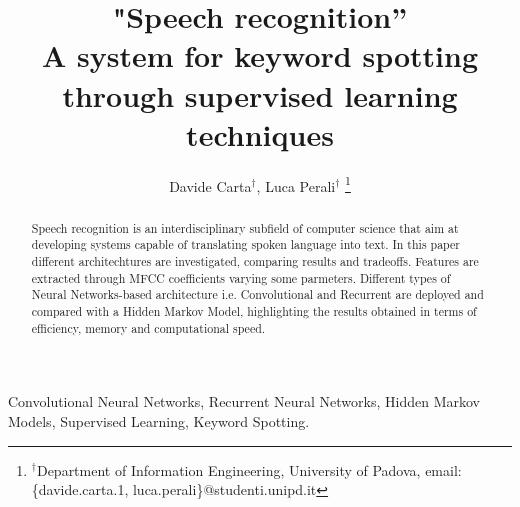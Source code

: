 \documentclass[10pt, conference, letterpaper]{IEEEtran}
\title{"Speech recognition'' \\ A system for keyword spotting through supervised learning techniques }
\author{Davide Carta$^\dag$, Luca Perali$^\dag$
\thanks{$^\dag$Department of Information Engineering, University of Padova, email: \{davide.carta.1, luca.perali\}@studenti.unipd.it}
}
\begin{document}
\maketitle

\begin{abstract}
 Speech recognition is an interdisciplinary subfield of computer science that aim at developing systems capable of translating spoken language into text. In this paper different architechtures are investigated, comparing results and tradeoffs. Features are extracted through MFCC coefficients varying some parmeters.
Different types of Neural Networks-based architecture i.e. Convolutional and Recurrent are deployed and compared with a Hidden Markov Model, highlighting the results obtained in terms of efficiency, memory and computational speed.\\
\end{abstract}

\IEEEkeywords
 Convolutional Neural Networks, Recurrent Neural Networks, Hidden Markov Models, Supervised Learning, Keyword Spotting. 
\endIEEEkeywords














\end{document}
